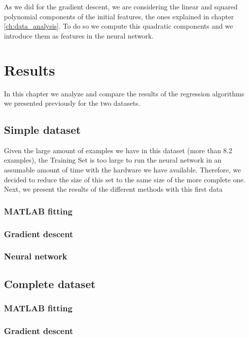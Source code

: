\documentclass[a4paper, report, oneside, UKenglish]{memoir}
\begin{document}
As we did for the gradient descent, we are considering the linear and squared polynomial components of the initial features, the ones explained in chapter \ref{ch:data_analysis}. To do so we compute this quadratic components and we introduce them as features in the neural network.


\chapter{Results} \label{ch:results}

In this chapter we analyze and compare the results of the regression algorithms we presented previously for the two datasets.

\section{Simple dataset}
Given the large amount of examples we have in this dataset (more than 8.2 examples), the Training Set is too large to run the neural network in an assumable amount of time with the hardware we have available. Therefore, we decided to reduce the size of this set to the same size of the more complete one. Next, we present the results of the different methods with this first data

\subsection{MATLAB fitting}

\subsection{Gradient descent}

\subsection{Neural network}


\section{Complete dataset}
\subsection{MATLAB fitting}

\subsection{Gradient descent}
\end{document}
